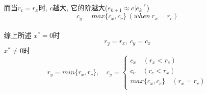 \documentclass{article}
\begin{document}
\begin{CJK}{UTF8}{gbsn}
  \paragraph{}
  而当$r_c = r_x$时, $c$越大, 它的阶越大($e_{k + 1} \approx c|e_{k}|^r$)
  \begin{equation}
    c_y = max\{c_x, c_c\}\ (when\ r_x = r_c)
  \end{equation}
  \paragraph{}
  综上所述
  $x^* = 0$时
  \begin{equation}
    r_y = r_x,\ c_y = c_x
  \end{equation}
  $x^* \not= 0$时
  \begin{equation}
    r_y = min\{r_x, r_c\}, \quad
    c_y =
    \begin{cases}
      c_x \quad (r_x < r_c) \\
      c_c \quad (r_c < r_x) \\
      max\{c_x, c_c\} \quad (r_x = r_c) \\
    \end{cases}
  \end{equation}
\end{CJK}
\end{document}
